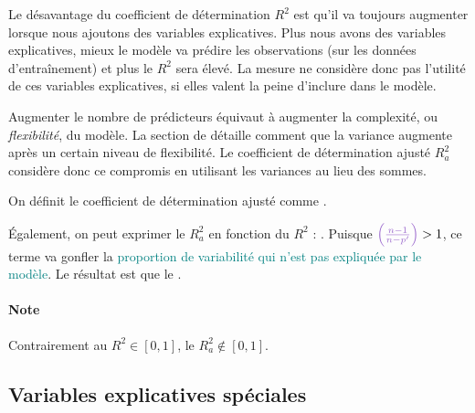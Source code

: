 \documentclass[french]{article}
\begin{document}
\begin{multicols*}{2}
\begin{definitionNOHFILL}
\begin{rappel_enhanced}[Contexte]
Le désavantage du coefficient de détermination $R^{2}$ est qu'il va toujours augmenter lorsque nous ajoutons des variables explicatives. Plus nous avons des variables explicatives, mieux le modèle va prédire les observations (sur les données d'entraînement) et plus le $R^{2}$ sera élevé. La mesure ne considère donc pas l'utilité de ces variables explicatives, si elles valent la peine d'inclure dans le modèle.

\bigskip

Augmenter le nombre de prédicteurs équivaut à augmenter la complexité, ou \textit{flexibilité}, du modèle. La section de \textit{\underline{}} détaille comment que la variance augmente après un certain niveau de flexibilité. Le coefficient de détermination ajusté $R^{2}_{a}$ considère donc ce compromis en utilisant les variances au lieu des sommes. 
\end{rappel_enhanced}

On définit le coefficient de détermination ajusté comme .

\bigskip

Également, on peut exprimer le $R^{2}_{a}$ en fonction du $R^{2}$ : . Puisque $\textcolor{amethyst}{\left(\frac{n - 1}{n - p'}\right)} > 1$,  ce terme va \textcolor{amethyst}{gonfler} la \textcolor{teal}{proportion de variabilité qui n'est pas expliquée par le modèle}. Le résultat est que le .

\paragraph{Note}	Contrairement au $R^{2} \in [0, 1]$, le $R^{2}_{a} \not\in [0, 1]$.
\end{definitionNOHFILL}




\columnbreak
\subsection{Variables explicatives spéciales}\label{subsec:SpecialExplVar}

\end{multicols*}
\end{document}
